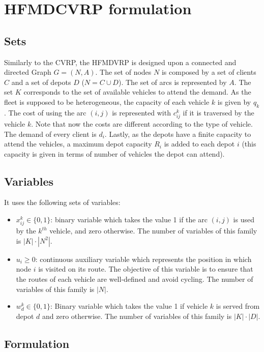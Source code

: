 \documentclass[preprint,review,12pt]{elsarticle}
\begin{document}
\section{HFMDCVRP formulation}

\subsection{Sets}
Similarly to the CVRP, the HFMDVRP is designed upon a connected and directed Graph $G = (N,A)$. The set of nodes $N$ is composed by a set of clients $C$ and a set of depots $D$ ($N = C \cup D$). The set of arcs is represented by $A$. The set $K$ corresponds to the set of available vehicles to attend the demand. As the fleet is supposed to be heterogeneous, the capacity of each vehicle $k$ is given by $q_k$. The cost of using the arc $(i,j)$ is represented with $c_{ij}^k$ if it is traversed by the vehicle $k$. Note that now the costs are different according to the type of vehicle. The demand of every client is $d_i$. Lastly, as the depots have a finite capacity to attend the vehicles, a maximum depot capacity $R_i$ is added to each depot $i$ (this capacity is given in terms of number of vehicles the depot can attend).

\subsection{Variables}
It uses the following sets of variables:

\begin{itemize}
	\item $x_{ij}^k \in \{0,1\}$: binary variable which takes the value 1 if the arc $(i,j)$ is used by the $k^{th}$ vehicle, and zero otherwise. The number of variables of this family is $|K| \cdot |N^2|$.
	\item $u_i \geq 0$: continuous auxiliary variable which represents the position in which node $i$ is visited on its route. The objective of this variable is to ensure that the routes of each vehicle are well-defined and avoid cycling. The number of variables of this family is $|N|$.
	\item  $w_d^k \in  \{0,1\}$: Binary variable which takes the value 1 if vehicle $k$ is served from depot $d$ and zero otherwise. The number of variables of this family is $|K| \cdot |D|$.
\end{itemize}

\subsection{Formulation}
\end{document}
